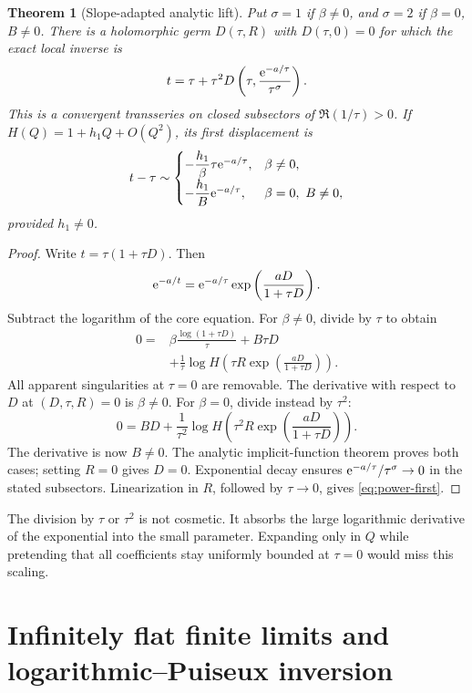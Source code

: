 \documentclass[11pt,a4paper]{article}
\numberwithin{equation}{section}
\newtheorem{theorem}{Theorem}[section]
\theoremstyle{definition}\newtheorem{definition}[theorem]{Definition}
\theoremstyle{remark}\newtheorem{remark}[theorem]{Remark}
\begin{document}
\begin{theorem}[Slope-adapted analytic lift]\label{thm:power}
Put $\sigma=1$ if $\beta\ne0$, and $\sigma=2$ if
$\beta=0$, $B\ne0$. There is a holomorphic germ $D(\tau,R)$ with
$D(\tau,0)=0$ for which the exact local inverse is
\begin{equation}\label{eq:power-inverse}
 t=\tau+\tau^2D\left(\tau,\frac{\mathrm e^{-a/\tau}}{\tau^\sigma}\right).
\end{equation}
This is a convergent transseries on closed subsectors of
$\Re(1/\tau)>0$. If $H(Q)=1+h_1Q+O(Q^2)$, its first displacement is
\begin{equation}\label{eq:power-first}
 t-\tau\sim
 \begin{cases}
 -\dfrac{h_1}{\beta}\tau\mathrm e^{-a/\tau},&\beta\ne0,\\[4pt]
 -\dfrac{h_1}{B}\mathrm e^{-a/\tau},&\beta=0,\ B\ne0,
 \end{cases}
\end{equation}
provided $h_1\ne0$.
\end{theorem}
\begin{proof}
Write $t=\tau(1+\tau D)$. Then
\[
 \mathrm e^{-a/t}=\mathrm e^{-a/\tau}
 \exp\left(\frac{aD}{1+\tau D}\right).
\]
Subtract the logarithm of the core equation. For $\beta\ne0$, divide
by $\tau$ to obtain
\begin{align*}
 0={}&\beta\frac{\log(1+\tau D)}{\tau}+B\tau D\\
 &+\frac1\tau\log H\left(\tau R
 \exp\left(\frac{aD}{1+\tau D}\right)\right).
\end{align*}
All apparent singularities at $\tau=0$ are removable. The derivative
with respect to $D$ at $(D,\tau,R)=0$ is $\beta\ne0$.
For $\beta=0$, divide instead by $\tau^2$:
\[
 0=BD+\frac1{\tau^2}\log H\left(\tau^2R
 \exp\left(\frac{aD}{1+\tau D}\right)\right).
\]
The derivative is now $B\ne0$. The analytic implicit-function theorem
proves both cases; setting $R=0$ gives $D=0$. Exponential decay ensures
$\mathrm e^{-a/\tau}/\tau^\sigma\to0$ in the stated subsectors. Linearization
in $R$, followed by $\tau\to0$, gives \eqref{eq:power-first}.
\end{proof}
The division by $\tau$ or $\tau^2$ is not cosmetic. It absorbs the
large logarithmic derivative of the exponential into the small parameter. Expanding
only in $Q$ while pretending that all coefficients stay uniformly bounded
at $\tau=0$ would miss this scaling.

\section{Infinitely flat finite limits and logarithmic--Puiseux inversion}
\label{sec:flat}
\end{document}
